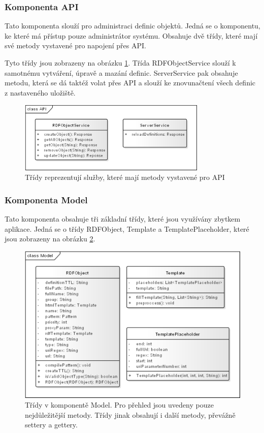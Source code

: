 \documentclass[thesis=B,czech]{FITthesis}[2012/06/26]
\begin{document}
  \subsubsection{Komponenta API}
    Tato komponenta slouží pro administraci definic objektů. Jedná se o komponentu, ke které má přístup pouze administrátor systému. Obsahuje dvě třídy, které
    mají své metody vystavené pro napojení přes API.
    
    Tyto třídy jsou zobrazeny na obrázku \ref{api_class}. Třída RDFObjectService slouží k samotnému vytváření, úpravě a mazání definic. ServerService pak obsahuje
    metodu, která se dá taktéž volat přes API a slouží ke znovunačtení všech definic z nastaveného uložiště.
    \begin{figure}\centering
 	\includegraphics[width=0.8\textwidth]{api_class}
 	\caption[Model tříd]{Třídy reprezentují služby, které mají metody vystavené pro API}\label{api_class}
    \end{figure}
    
    \subsubsection{Komponenta Model}
    Tato komponenta obsahuje tři základní třídy, které jsou využívány zbytkem aplikace. Jedná se o třídy RDFObject, Template a TemplatePlaceholder, které jsou zobrazeny
    na obrázku \ref{model_class}.
    
     \begin{figure}\centering
 	\includegraphics[width=\textwidth]{model_class}
 	\caption[Model tříd]{Třídy v komponentě Model. Pro přehled jsou uvedeny pouze nejdůležitější metody. Třídy jinak obsahují i další metody, převážně settery a gettery.}\label{model_class}
    \end{figure}
    
\end{document}
